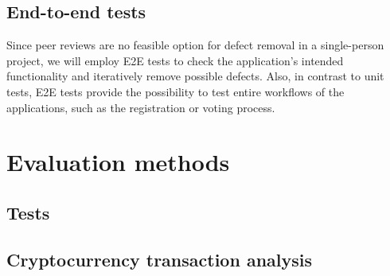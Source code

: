 \subsection{End-to-end tests}\label{subsec:end-to-end-tests}

Since peer reviews are no feasible option for defect removal in a single-person project, we will employ E2E tests to check the application’s intended functionality and iteratively remove possible defects.
Also, in contrast to unit tests, \gls{E2E} tests provide the possibility to test entire workflows of the applications, such as the registration or voting process.

\section{Evaluation methods}\label{sec:evaluation-methods}

\subsection{Tests}\label{subsec:tests}
\subsection{Cryptocurrency transaction analysis}\label{subsec:crypto-currency-transaction-analysis}